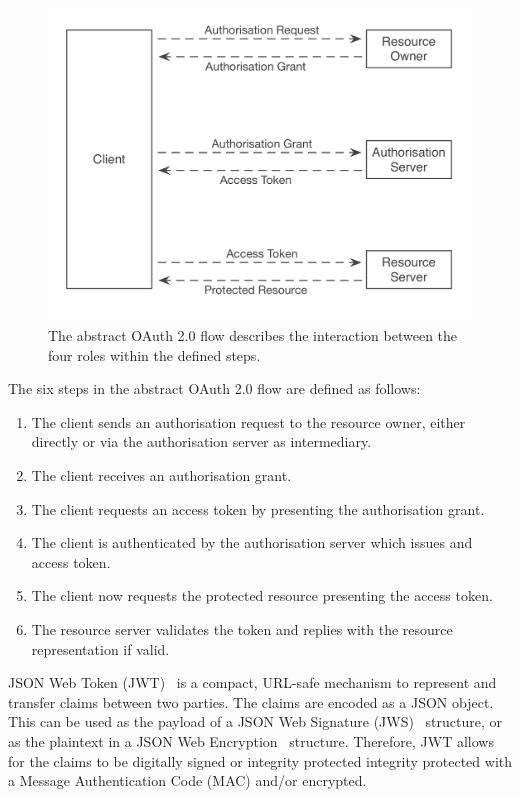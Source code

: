 \begin{figure}
\includegraphics[width=\textwidth]{figures/OAuth2Flow.png}
\caption[OAuth 2.0 Flow.]{The abstract OAuth 2.0 flow describes the interaction between the four roles within the defined steps.
\label{fig:oauth2flow}}
\end{figure}

The six steps in the abstract OAuth 2.0 flow are defined as follows:
\begin{enumerate}
    \item The client sends an authorisation request to the resource owner, either directly or via the authorisation server as intermediary.
    \item The client receives an authorisation grant.
    \item The client requests an access token by presenting the authorisation grant.
    \item The client is authenticated by the authorisation server which issues and access token.
    \item The client now requests the protected resource presenting the access token.
    \item The resource server validates the token and replies with the resource representation if valid.
\end{enumerate}

JSON Web Token (JWT)~\cite{jones2015json} is a compact, URL-safe mechanism to represent and transfer claims between two parties. The claims are encoded as a JSON object. This can be used as the payload of a JSON Web Signature (JWS)~\cite{jones2014n} structure, or as the plaintext in a JSON Web Encryption~\cite{jones2015jwe} structure. Therefore, JWT allows for the claims to be digitally signed or integrity protected integrity protected with a Message Authentication Code (MAC) and/or encrypted.

